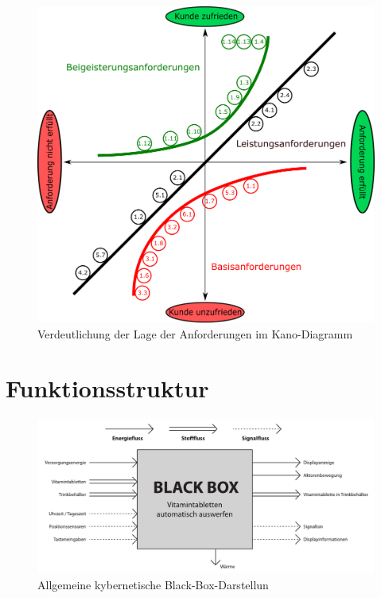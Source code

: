 \FloatBarrier
\begin{figure}[h!]
	\centering
	\includegraphics[width=\textwidth]{chapter/Bilder/kano} 
	\caption{Verdeutlichung der Lage der Anforderungen im Kano-Diagramm}
\end{figure}

\newpage
\section{Funktionsstruktur}

\begin{figure}[H]
	\centering
	\includegraphics[width=1.0\linewidth]{../drawings/funktionsstruktur_kybernetisch}
	\caption{Allgemeine kybernetische Black-Box-Darstellun}
	\label{fig:funktionsstrukturkybernetisch}
\end{figure}

